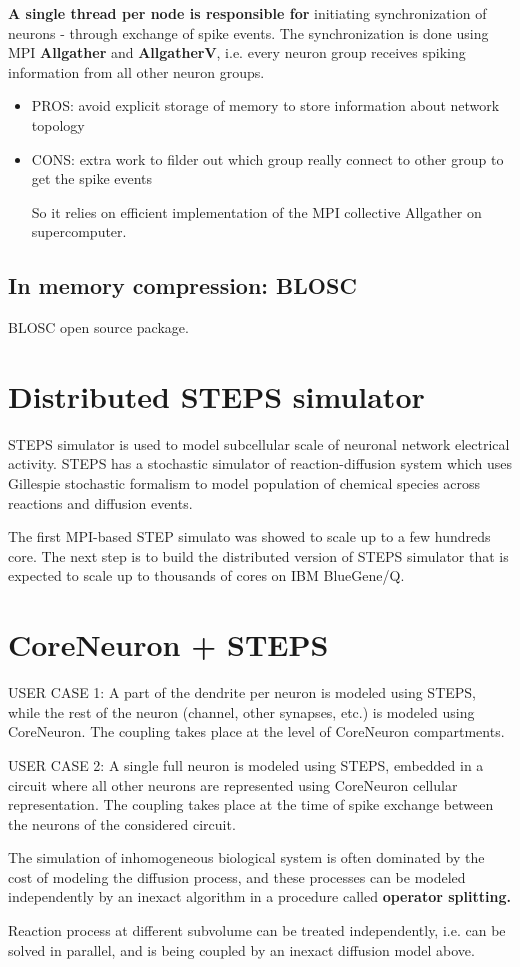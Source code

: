 {\bf A single thread per node is responsible for}
initiating synchronization of neurons - through exchange of spike events.
The synchronization is done using MPI {\bf Allgather} and {\bf AllgatherV}, i.e. 
every neuron group receives spiking information from all other neuron groups.
\begin{itemize}
  \item PROS: avoid explicit storage of memory to store information about
  network topology
  
  
  \item CONS: extra work to filder out which group really connect to other group
  to get the spike events
  
  So it relies on efficient implementation of the MPI collective Allgather on
  supercomputer.
\end{itemize} 

\subsection{In memory compression: BLOSC}

BLOSC open source package.

\section{Distributed STEPS simulator}
\label{sec:STEPS-simulator}

STEPS simulator is used to model subcellular scale of neuronal network
electrical activity.
STEPS has a stochastic simulator of reaction-diffusion system which uses
Gillespie stochastic formalism to model population of chemical species across
reactions and diffusion events.

The first MPI-based STEP simulato was showed to scale up to a few hundreds core.
The next step is to build the distributed version of STEPS simulator that is
expected to scale up to thousands of cores on IBM BlueGene/Q.

\section{CoreNeuron + STEPS}

USER CASE 1: A part of the dendrite per neuron is modeled using STEPS, while
the rest of the neuron (channel, other synapses, etc.) is modeled using CoreNeuron. The coupling
takes place at the level of CoreNeuron compartments.


USER CASE 2: A single full neuron is modeled using STEPS, embedded in a circuit
where all other neurons are represented using CoreNeuron cellular
representation. The coupling takes place at the time of spike exchange between
the neurons of the considered circuit.


The simulation of inhomogeneous biological system is often dominated by the cost
of modeling the diffusion process, and these processes can be modeled
independently by an inexact algorithm in a procedure called {\bf operator
splitting.}

Reaction process at different subvolume can be treated independently, i.e. can
be solved in parallel, and is being coupled by an inexact diffusion model above.



